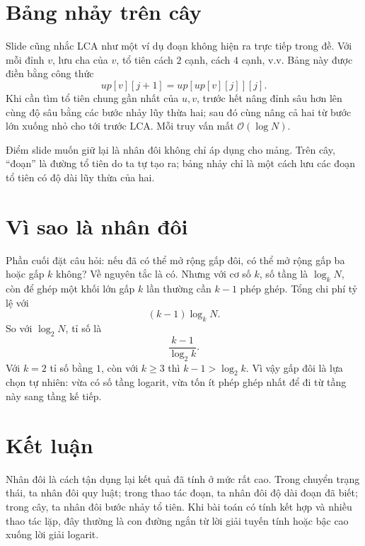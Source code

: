 \documentclass[11pt]{article}
\newcommand{\Oh}{\mathcal{O}}
\begin{document}
\section{Bảng nhảy trên cây}

Slide cũng nhắc LCA như một ví dụ đoạn không hiện ra trực tiếp trong đề. Với
mỗi đỉnh \(v\), lưu cha của \(v\), tổ tiên cách \(2\) cạnh, cách \(4\) cạnh,
v.v. Bảng này được điền bằng công thức
\[
  up[v][j+1]=up[up[v][j]][j].
\]
Khi cần tìm tổ tiên chung gần nhất của \(u,v\), trước hết nâng đỉnh sâu hơn
lên cùng độ sâu bằng các bước nhảy lũy thừa hai; sau đó cùng nâng cả hai từ
bước lớn xuống nhỏ cho tới trước LCA. Mỗi truy vấn mất \(\Oh(\log N)\).

Điểm slide muốn giữ lại là nhân đôi không chỉ áp dụng cho mảng. Trên cây,
``đoạn'' là đường tổ tiên do ta tự tạo ra; bảng nhảy chỉ là một cách lưu các
đoạn tổ tiên có độ dài lũy thừa của hai.

\section{Vì sao là nhân đôi}

Phần cuối đặt câu hỏi: nếu đã có thể mở rộng gấp đôi, có thể mở rộng gấp ba
hoặc gấp \(k\) không? Về nguyên tắc là có. Nhưng với cơ số \(k\), số tầng là
\(\log_k N\), còn để ghép một khối lớn gấp \(k\) lần thường cần \(k-1\) phép
ghép. Tổng chi phí tỷ lệ với
\[
  (k-1)\log_k N.
\]
So với \(\log_2 N\), tỉ số là
\[
  \frac{k-1}{\log_2 k}.
\]
Với \(k=2\) tỉ số bằng \(1\), còn với \(k\ge3\) thì \(k-1>\log_2 k\). Vì vậy
gấp đôi là lựa chọn tự nhiên: vừa có số tầng logarit, vừa tốn ít phép ghép
nhất để đi từ tầng này sang tầng kế tiếp.

\section{Kết luận}

Nhân đôi là cách tận dụng lại kết quả đã tính ở mức rất cao. Trong chuyển
trạng thái, ta nhân đôi quy luật; trong thao tác đoạn, ta nhân đôi độ dài
đoạn đã biết; trong cây, ta nhân đôi bước nhảy tổ tiên. Khi bài toán có tính
kết hợp và nhiều thao tác lặp, đây thường là con đường ngắn từ lời giải tuyến
tính hoặc bậc cao xuống lời giải logarit.
\end{document}
